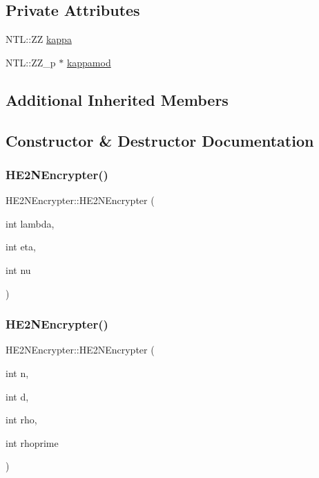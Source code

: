 \subsection*{Private Attributes}
\begin{DoxyCompactItemize}
\item 
N\+T\+L\+::\+ZZ \hyperlink{classHE2NEncrypter_afd61d38d86bd894ba9e0b4f0bc6265b2}{kappa}
\item 
N\+T\+L\+::\+Z\+Z\+\_\+p $\ast$ \hyperlink{classHE2NEncrypter_ae13c7d0f1d11f2177f7183c50d0614a7}{kappamod}
\end{DoxyCompactItemize}
\subsection*{Additional Inherited Members}


\subsection{Constructor \& Destructor Documentation}
\mbox{\label{classHE2NEncrypter_aa71432cbbe9565717fc5af638649d8d8}} 
\subsubsection{\texorpdfstring{H\+E2\+N\+Encrypter()}{HE2NEncrypter()}\hspace{0.1cm}{\footnotesize\ttfamily [1/2]}}
{\footnotesize\ttfamily H\+E2\+N\+Encrypter\+::\+H\+E2\+N\+Encrypter (\begin{DoxyParamCaption}\item[{int}]{lambda,  }\item[{int}]{eta,  }\item[{int}]{nu }\end{DoxyParamCaption})}

\mbox{\label{classHE2NEncrypter_a3cb8269ce3f3de2f9a12d350366b36f9}} 
\subsubsection{\texorpdfstring{H\+E2\+N\+Encrypter()}{HE2NEncrypter()}\hspace{0.1cm}{\footnotesize\ttfamily [2/2]}}
{\footnotesize\ttfamily H\+E2\+N\+Encrypter\+::\+H\+E2\+N\+Encrypter (\begin{DoxyParamCaption}\item[{int}]{n,  }\item[{int}]{d,  }\item[{int}]{rho,  }\item[{int}]{rhoprime }\end{DoxyParamCaption})}

